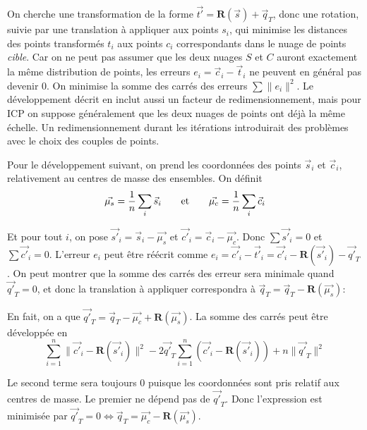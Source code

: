 \documentclass[a4paper,10pt]{scrreprt}
\begin{document}
On cherche une transformation de la forme $\vec{t'} = \mathbf{R}(\vec{s}) + \vec{q}_T$, donc une rotation, suivie par une translation à appliquer aux points $s_i$, qui minimise les distances des points transformés $t_i$ aux points $c_i$ correspondants dans le nuage de points \emph{cible}. Car on ne peut pas assumer que les deux nuages $S$ et $C$ auront exactement la même distribution de points, les erreurs $e_i = \vec{c}_i - \vec{t}_i$ ne peuvent en général pas devenir $0$. On minimise la somme des carrés des erreurs $\sum \| e_i \|^2$. Le développement décrit en \cite{Horn1986} inclut aussi un facteur de redimensionnement, mais pour ICP on suppose généralement que les deux nuages de points ont déjà la même échelle. Un redimensionnement durant les itérations introduirait des problèmes avec le choix des couples de points.

Pour le développement suivant, on prend les coordonnées des points $\vec{s}_i$ et $\vec{c}_i$, relativement au centres de masse des ensembles. On définit
\begin{equation}
	\vec{\mu_s} = \frac{1}{n} \sum_{i} \vec{s}_i
	\hspace{7mm} \text{et} \hspace{7mm}
	\vec{\mu_c} = \frac{1}{n} \sum_{i} \vec{c}_i
\end{equation}

Et pour tout $i$, on pose $\vec{s'}_i = \vec{s}_i - \vec{\mu_s}$ et $\vec{c'}_i = \vec{c}_i - \vec{\mu_c}$. Donc $\sum \vec{s'}_i = 0$ et $\sum \vec{c'}_i = 0$. L'erreur $e_i$ peut être réécrit comme $e_i = \vec{c'}_i - \vec{t'}_i = \vec{c'}_i - \mathbf{R}(\vec{s'}_i) - \vec{q'}_T$. On peut montrer que la somme des carrés des erreur sera minimale quand $\vec{q'}_T = 0$, et donc la translation à appliquer correspondra à $\vec{q}_T = \vec{q}_T - \mathbf{R}(\vec{\mu_s})$:

En fait, on a que $\vec{q'}_T = \vec{q}_T - \vec{\mu_c} + \mathbf{R}(\vec{\mu_s})$. La somme des carrés peut être développée en
\begin{equation}
	\sum_{i=1}^{n} \| \vec{c'}_i - \mathbf{R}(\vec{s'}_i) \|^2 - 2 \vec{q'}_T \sum_{i=1}^{n} (\vec{c'}_i - \mathbf{R}(\vec{s'}_i)) + n \|\vec{q'}_T\|^2
\end{equation}

Le second terme sera toujours $0$ puisque les coordonnées sont pris relatif aux centres de masse. Le premier ne dépend pas de $\vec{q'}_T$. Donc l'expression est minimisée par $\vec{q'}_T = 0 \iff \vec{q}_T = \vec{\mu_c} - \mathbf{R}(\vec{\mu_s})$.
\end{document}
